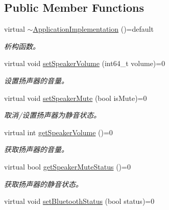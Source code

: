 \subsection*{Public Member Functions}
\begin{DoxyCompactItemize}
\item 
\mbox{\label{classduerOSDcsSDK_1_1sdkInterfaces_1_1ApplicationImplementation_a676b760481c0ea05cd2a870b6b324ad7}} 
virtual \hyperlink{classduerOSDcsSDK_1_1sdkInterfaces_1_1ApplicationImplementation_a676b760481c0ea05cd2a870b6b324ad7}{$\sim$\+Application\+Implementation} ()=default
\begin{DoxyCompactList}\small\item\em 析构函数。 \end{DoxyCompactList}\item 
virtual void \hyperlink{classduerOSDcsSDK_1_1sdkInterfaces_1_1ApplicationImplementation_a9fb5a1e88b63327a7216335c8668a427}{set\+Speaker\+Volume} (int64\+\_\+t volume)=0
\begin{DoxyCompactList}\small\item\em 设置扬声器的音量。 \end{DoxyCompactList}\item 
virtual void \hyperlink{classduerOSDcsSDK_1_1sdkInterfaces_1_1ApplicationImplementation_af1c0b876db837a498edfd46c07a642b0}{set\+Speaker\+Mute} (bool is\+Mute)=0
\begin{DoxyCompactList}\small\item\em 取消/设置扬声器为静音状态。 \end{DoxyCompactList}\item 
virtual int \hyperlink{classduerOSDcsSDK_1_1sdkInterfaces_1_1ApplicationImplementation_a8578e0315740c83868c7d8818ad23023}{get\+Speaker\+Volume} ()=0
\begin{DoxyCompactList}\small\item\em 获取扬声器的音量。 \end{DoxyCompactList}\item 
virtual bool \hyperlink{classduerOSDcsSDK_1_1sdkInterfaces_1_1ApplicationImplementation_ae07cada57638548151d4ae53923ffd85}{get\+Speaker\+Mute\+Status} ()=0
\begin{DoxyCompactList}\small\item\em 获取扬声器的静音状态。 \end{DoxyCompactList}\item 
virtual void \hyperlink{classduerOSDcsSDK_1_1sdkInterfaces_1_1ApplicationImplementation_ab7c22526b77d47b463d8bfcba5320180}{set\+Bluetooth\+Status} (bool status)=0

\end{DoxyCompactItemize}
